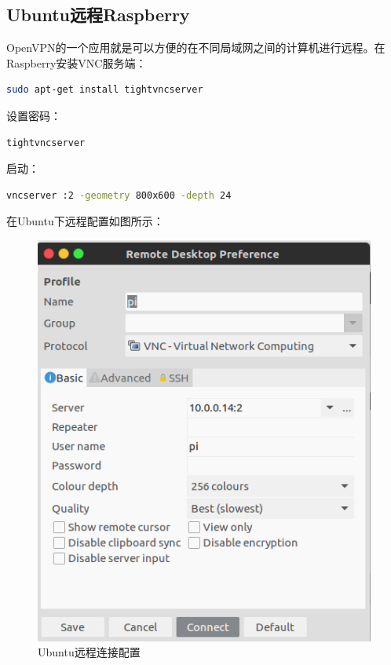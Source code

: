 \documentclass[letter]{book}
\begin{document}
\subsection{Ubuntu远程Raspberry}

OpenVPN的一个应用就是可以方便的在不同局域网之间的计算机进行远程。在Raspberry安装VNC服务端：

\begin{lstlisting}[language=Bash]
sudo apt-get install tightvncserver
\end{lstlisting}

设置密码：

\begin{lstlisting}[language=Bash]
tightvncserver
\end{lstlisting}

启动：

\begin{lstlisting}[language=Bash]
vncserver :2 -geometry 800x600 -depth 24
\end{lstlisting}

在Ubuntu下远程配置如图\label{raspberryremtoeconfig}所示：

\begin{figure}[htbp]
	\centering
	\includegraphics[scale=0.4]{raspberryremtoeconfig.png}
	\caption{Ubuntu远程连接配置}
	\label{fig:raspberryremtoeconfig}
\end{figure}
\end{document}
